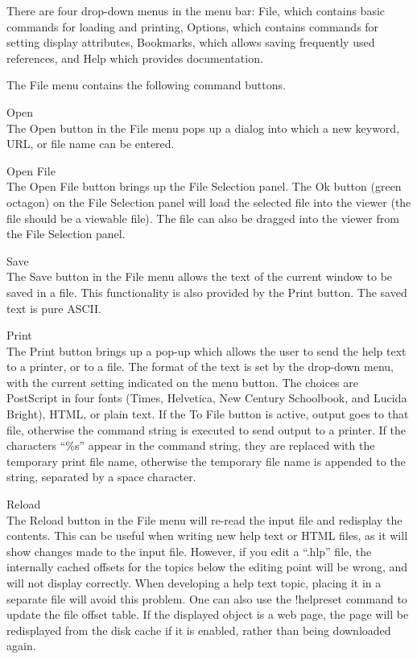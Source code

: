 There are four drop-down menus in the menu bar:  {\cb File}, which
contains basic commands for loading and printing, {\cb Options}, which
contains commands for setting display attributes, {\cb Bookmarks},
which allows saving frequently used references, and {\cb Help} which
provides documentation.

The {\cb File} menu contains the following command buttons.
\begin{description}
\item{\cb Open}\\
The {\cb Open} button in the {\cb File} menu pops up a dialog into
which a new keyword, URL, or file name can be entered.

\item{\cb Open File}\\
The {\cb Open File} button brings up the {\cb File Selection} panel. 
The {\cb Ok} button (green octagon) on the {\cb File Selection} panel
will load the selected file into the viewer (the file should be a
viewable file).  The file can also be dragged into the viewer from the
{\cb File Selection} panel.

\item{\cb Save}\\
The {\cb Save} button in the {\cb File} menu allows the text of the
current window to be saved in a file.  This functionality is also
provided by the {\cb Print} button.  The saved text is pure ASCII.

\item{\cb Print}\\
The {\cb Print} button brings up a pop-up which allows the user to
send the help text to a printer, or to a file.  The format of the text
is set by the drop-down menu, with the current setting indicated on
the menu button.  The choices are PostScript in four fonts (Times,
Helvetica, New Century Schoolbook, and Lucida Bright), HTML, or plain
text.  If the {\cb To File} button is active, output goes to that
file, otherwise the command string is executed to send output to a
printer.  If the characters ``{\vt \%s}'' appear in the command
string, they are replaced with the temporary print file name,
otherwise the temporary file name is appended to the string, separated
by a space character.

\item{\cb Reload}\\
The {\cb Reload} button in the {\cb File} menu will re-read the input
file and redisplay the contents.  This can be useful when writing new
help text or HTML files, as it will show changes made to the input
file.  However, if you edit a ``{\vt .hlp}'' file, the internally
cached offsets for the topics below the editing point will be wrong,
and will not display correctly.  When developing a help text topic,
placing it in a separate file will avoid this problem.  One can also
use the {\cb !helpreset} command to update the file offset table.  If
the displayed object is a web page, the page will be redisplayed from
the disk cache if it is enabled, rather than being downloaded again.


\end{description}
